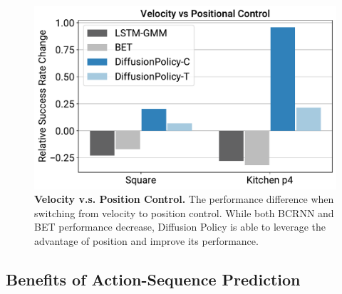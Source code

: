 \documentclass[Afour,sageh,times]{sagej}
\newcommand{\shuran}[1]{\textcolor{MyDarkGreen}{[Shuran: #1]}}
\begin{document}

 
\begin{figure}[h]
\centering
\includegraphics[width=0.85\linewidth]{figure/pos_vs_vel_figure.pdf}
\caption{\textbf{Velocity v.s. Position Control.} \label{fig:pos_vs_vel} The performance difference when switching from velocity to position control. While both BCRNN and BET performance decrease, Diffusion Policy is able to leverage the advantage of position and improve its performance. }
\vspace{-4mm}
\end{figure}



\subsection{Benefits of Action-Sequence Prediction}
\label{sec:action_sequence}
\end{document}
